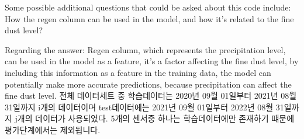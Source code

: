         Some possible additional questions that could be asked about this code include:
        How the regen column can be used in the model, and how it's related to the fine dust level?
        
        Regarding the answer:
        Regen column, which represents the precipitation level, can be used in the model as a feature, it's a factor affecting the fine dust level, by including this information as a feature in the training data, the model can potentially make more accurate predictions, because precipitation can affect the fine dust level.
        전체 데이터세트 중 학습데이터는 2020년 09월 01일부터 2021년 08월 31일까지 i개의 데이터이며 test데이터에는 2021년 09월 01일부터 2022년 08월 31일까지 j개의 데이터가 사용되었다. 5개의 센서중 하나는 학습데이터에만 존재하기 떄문에 평가단계에서는 제외됩니다.